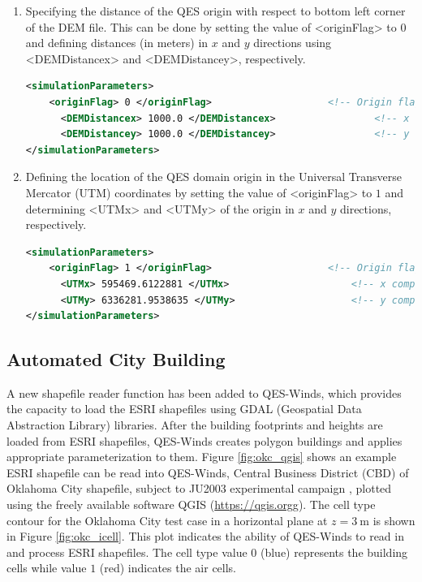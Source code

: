 \begin{enumerate}
\item Specifying the distance of the QES origin with respect to bottom left corner of the DEM file. This can be done by setting the value of <originFlag> to $0$ and defining distances (in meters) in $x$ and $y$ directions using <DEMDistancex> and <DEMDistancey>, respectively.

\begin{lstlisting}[language=XML]
<simulationParameters>
  	<originFlag> 0 </originFlag>					<!-- Origin flag (0- DEM coordinates (default), 1- UTM coordinates) -->
	  <DEMDistancex> 1000.0 </DEMDistancex> 				<!-- x component (m) of origin in DEM coordinates (if originFlag = 0) -->
	  <DEMDistancey> 1000.0 </DEMDistancey> 				<!-- y component (m) of origin in DEM coordinates (if originFlag = 0) -->
</simulationParameters>
\end{lstlisting}

\item Defining the location of the QES domain origin in the Universal Transverse Mercator (UTM) coordinates by setting the value of <originFlag> to $1$ and determining <UTMx> and <UTMy> of the origin in $x$ and $y$ directions, respectively.

\begin{lstlisting}[language=XML]
<simulationParameters>
  	<originFlag> 1 </originFlag>					<!-- Origin flag (0- DEM coordinates (default), 1- UTM coordinates) -->
	  <UTMx> 595469.6122881 </UTMx> 					<!-- x component (m) of origin in UTM DEM coordinates (if originFlag = 1)-->
	  <UTMy> 6336281.9538635 </UTMy> 					<!-- y component (m) of origin in UTM DEM coordinates (if originFlag = 1)-->
</simulationParameters>
\end{lstlisting}

\end{enumerate}

\subsection{Automated City Building}

A new shapefile reader function has been added to QES-Winds, which provides the capacity to load the ESRI shapefiles using GDAL (Geospatial Data Abstraction Library) libraries. After the building footprints and heights are loaded from ESRI shapefiles, QES-Winds creates polygon buildings and applies appropriate parameterization to them. Figure \ref{fig:okc_qgis} shows an example ESRI shapefile can be read into QES-Winds, Central Business District (CBD) of Oklahoma City shapefile, subject to JU2003 experimental campaign \cite{allwine2006joint}, plotted using the freely available software QGIS (\href{https://qgis.org}{https://qgis.orgg}). The cell type contour for the Oklahoma City test case in a horizontal plane at $z=3\ \si{\metre}$ is shown in Figure \ref{fig:okc_icell}. This plot indicates the ability of QES-Winds to read in and process ESRI shapefiles. The cell type value $0$ (blue) represents the building cells while value $1$ (red) indicates the air cells.

